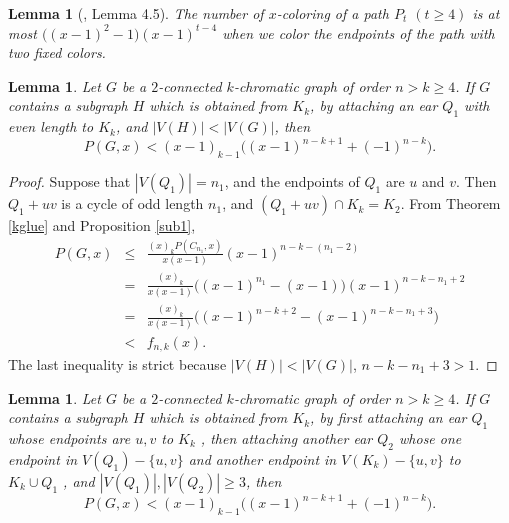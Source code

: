 \documentclass[12pt]{article}
\newtheorem{lemma}[theorem]{Lemma}
\theoremstyle{definition}
\begin{document}
\begin{lemma}[\cite{EG17}, Lemma 4.5]\label{path} The number of $x$-coloring of a path $P_t$ $(t\geq 4)$ is at most $\big((x-1)^2-1\big)(x-1)^{t-4}$ when we color the endpoints of the path with two fixed colors.
\end{lemma}


\begin{lemma}\label{oddc} Let $G$ be a $2$-connected $k$-chromatic graph of order $n>k\geq 4$. If $G$ contains a subgraph $H$ which is obtained from $K_k$, by attaching an ear $Q_1$ with even length to $K_k$, and $|V(H)|<|V(G)|$, then
$$P(G,x)< (x-1)_{k-1}\big((x-1)^{n-k+1}+(-1)^{n-k}\big).$$
\end{lemma}

\begin{proof} Suppose that $|V(Q_1)|=n_1$, and the endpoints of $Q_1$ are $u$ and $v$. Then $Q_1+uv$ is a cycle of odd length $n_1$, and $(Q_1+uv) \cap K_k=K_2$. From Theorem \ref{kglue} and Proposition \ref{sub1},
\begin{eqnarray*}P(G,x)&\leq &\frac{(x)_kP(C_{n_1},x)}{x(x-1)}(x-1)^{n-k-(n_1-2)}\\
&=&\frac{(x)_k}{x(x-1)}\big((x-1)^{n_1}-(x-1)\big)(x-1)^{n-k-n_1+2}\\
&=&\frac{(x)_k}{x(x-1)}\big((x-1)^{n-k+2}-(x-1)^{n-k-n_1+3}\big)\\
&< &f_{n,k}(x).
\end{eqnarray*}
The last inequality is strict because $|V(H)|<|V(G)|$, $n-k-n_1+3>1$.
\end{proof}


\begin{lemma}\label{2ear} Let $G$ be a $2$-connected $k$-chromatic graph of order $n>k\geq 4$. If $G$ contains a subgraph $H$  which is obtained from $K_k$, by first attaching an ear $Q_1$ whose endpoints are $u, v$ to $K_k$ , then attaching another ear $Q_2$ whose one endpoint in $V(Q_1)-\{u,v\}$ and another endpoint in $V(K_k)-\{u,v\}$ to $K_k\cup Q_1$ , and $|V(Q_1)|, |V(Q_2)|\geq 3$, then
$$P(G,x)< (x-1)_{k-1}\big((x-1)^{n-k+1}+(-1)^{n-k}\big).$$
\end{lemma}
\end{document}
